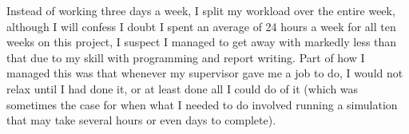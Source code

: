 \documentclass[12pt,a4paper,openright]{article}
\begin{document}
Instead of working three days a week, I split my workload over the entire week, although I will confess I doubt I spent an average of 24 hours a week for all ten weeks on this project, I suspect I managed to get away with markedly less than that due to my skill with programming and report writing. Part of how I managed this was that whenever my supervisor gave me a job to do, I would not relax until I had done it, or at least done all I could do of it (which was sometimes the case for when what I needed to do involved running a simulation that may take several hours or even days to complete). 
\end{document}
